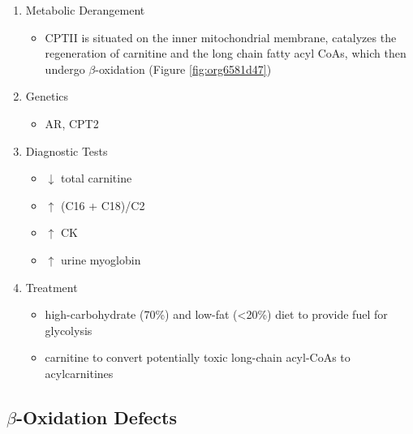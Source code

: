 \documentclass[12pt]{scrartcl}
\begin{document}
\begin{enumerate}
\item Metabolic Derangement
\label{sec:org439be5a}
\begin{itemize}
\item CPTII is situated on the inner mitochondrial membrane, catalyzes the
regeneration of carnitine and the long chain fatty acyl CoAs, which
then undergo \(\beta\)-oxidation (Figure \ref{fig:org6581d47})
\end{itemize}
\item Genetics
\label{sec:org0edefda}
\begin{itemize}
\item AR, CPT2
\end{itemize}
\item Diagnostic Tests
\label{sec:org8dbeacc}
\begin{itemize}
\item \(\downarrow\) total carnitine
\item \(\uparrow\) (C16 + C18)/C2
\item \(\uparrow\) CK
\item \(\uparrow\) urine myoglobin
\end{itemize}
\item Treatment
\label{sec:orgf7075b6}
\begin{itemize}
\item high-carbohydrate (70\%) and low-fat (<20\%) diet to provide fuel for glycolysis
\item carnitine to convert potentially toxic long-chain acyl-CoAs to
acylcarnitines
\end{itemize}
\end{enumerate}
\subsection{\(\beta\)-Oxidation Defects}
\label{sec:org5f9090a}
\end{document}

